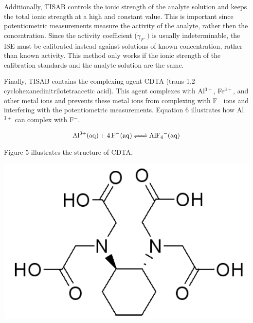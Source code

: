 \documentclass{article}
\begin{document}
Additionally, TISAB controls the ionic strength of the analyte solution and
keeps the total ionic strength at a high and constant value.
This is important since potentiometric measurements measure the activity of the
analyte, rather then the concentration. Since the activity coefficient
($\gamma_{F^-})$ is usually indeterminable, the ISE must be calibrated instead
against solutions of known concentration, rather than known activity. This
method only works if the ionic strength of the calibration standards and the
analyte solution are the same. \cite{nmt}

Finally, TISAB contains the complexing agent CDTA
(trans-1,2-cyclohexanedinitrilotetraacetic acid). This agent complexes with
Al$^{3+}$, Fe$^{3+}$, and other metal ions and prevents these metal ions from complexing with
F$^-$ ions and interfering with the potentiometric measurements. Equation 6
illustrates how Al$^{3+}$ can complex with F$^-$.
\begin{center}
    \begin{equation}
        \ce {Al^{3+}(aq) + 4F-(aq) <=> AlF4-(aq)}
    \end{equation}
\end{center}

Figure 5 illustrates the structure of CDTA.
\begin{center}
    \includegraphics[scale=0.5]{cdta}
\end{center}
\end{document}
